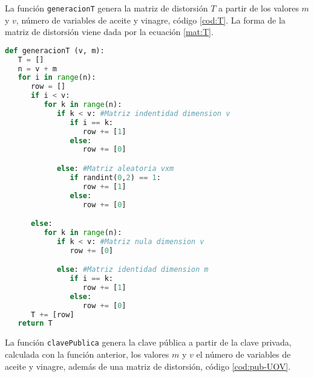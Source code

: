 La función \texttt{generacionT} genera la matriz de distorsión $T$ a partir de los valores $m$ y $v$, número de variables de aceite y vinagre, código \ref{cod:T}. La forma de la matriz de distorsión viene dada por la ecuación \ref{mat:T}.

\begin{table}[H]
	\begin{center}
	\centering
	\end{center}
	\caption{Parámetros de la función \texttt{generacionT}}
\end{table}

\vspace{0.25cm}

\begin{lstlisting}[language=Python,caption=Generación matriz $T$, label=cod:T]
def generacionT (v, m):
   T = []
   n = v + m
   for i in range(n):
      row = []
      if i < v:
         for k in range(n):
            if k < v: #Matriz indentidad dimension v
               if i == k:
                  row += [1]
               else:
                  row += [0]

            else: #Matriz aleatoria vxm
               if randint(0,2) == 1:
                  row += [1]
               else:
                  row += [0]

      else:
         for k in range(n):
            if k < v: #Matriz nula dimension v
               row += [0]

            else: #Matriz identidad dimension m
               if i == k:
                  row += [1]
               else:
                  row += [0]
      T += [row]
   return T
\end{lstlisting}

La función \texttt{clavePublica} genera la clave pública a partir de la clave privada, calculada con la función anterior, los valores $m$ y $v$ el número de variables de aceite y vinagre, además de una matriz de distorsión, código \ref{cod:pub-UOV}.

